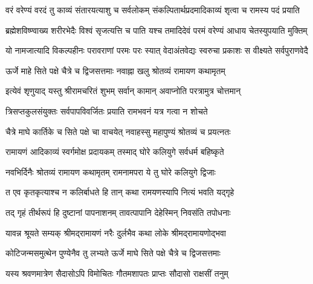  

\twolineshloka
{वरं वरेण्यं वरदं तु काव्यं संतारयत्याशु च सर्वलोकम्}
{संकल्पितार्थप्रदमादिकाव्यं शृत्वा च रामस्य पदं प्रयाति}%

 

\twolineshloka
{ब्रह्मेशविष्ण्वाख्य शरीरभेदैः विश्वं सृजत्यत्ति च पाति यश्च}
{तमादिदेवं परमं वरेण्यं आधाय चेतस्युपयाति मुक्तिम्}%

 

\twolineshloka
{यो नामजात्यादि विकल्पहीनः परावराणां परमः परः स्यात्}
{वेदाअंतवेद्यः स्वरुचा प्रकाशः स वीक्ष्यते सर्वपुराणवेदै}%

 

\twolineshloka
{ऊर्जे माहे सिते पक्षे चैत्रे च द्विजसत्तमाः}
{नवाह्ना खलु श्रोतव्यं रामायण कथामृतम्}%

 

\twolineshloka
{इत्येवं शृणुयाद् यस्तु श्रीरामचरितं शुभम्}
{सर्वान् कामान् अवाप्नोति परत्रामुत्र चोत्तमान्}%

 

\twolineshloka
{त्रिसप्तकुलसंयुक्तः सर्वपापविवर्जितः}
{प्रयाति रामभवनं यत्र गत्वा न शोचते}%

 

\twolineshloka
{चैत्रे माघे कार्तिके च सिते पक्षे चा वाचयेत्}
{नवाहस्सु महापुण्यं श्रोतव्यं च प्रयत्‍नतः}%

 

\twolineshloka
{रामायणं आदिकाव्यं स्वर्गमोक्ष प्रदायकम्}
{तस्माद् घोरे कलियुगे सर्वधर्म बहिष्कृते}%

 

\twolineshloka
{नवभिर्दिनैः श्रोतव्यं रामायण कथामृतम्}
{रामनामपरा ये तु घोरे कलियुगे द्विजाः}%

 

\twolineshloka
{त एव कृतकृत्याश्च न कलिर्बाधते हि तान्}
{कथा रामयणस्यापि नित्यं भवति यद्‌गृहे}%

 

\twolineshloka
{तद् गृहं तीर्थरूपं हि दुष्टानां पापनाशनम्}
{तावत्पापानि देहेस्मिन् निवसंति तपोधनाः}%

 

\twolineshloka
{यावन्न श्रूयते सम्यक् श्रीमद्‌रामायणं नरैः}
{दुर्लभैव कथा लोके श्रीमद्‌रामायणोद्‌भवा}%

 

\twolineshloka
{कोटिजन्मसमुत्थेन पुण्येनैव तु लभ्यते}
{ऊर्जे माघे सिते पक्षे चैत्रे च द्विजसत्तमाः}%

 

\twolineshloka
{यस्य श्रवणमात्रेण सैदासोऽपि विमोचितः}
{गौतमशापतः प्राप्तः सौदासो राक्षसीं तनुम्}%


